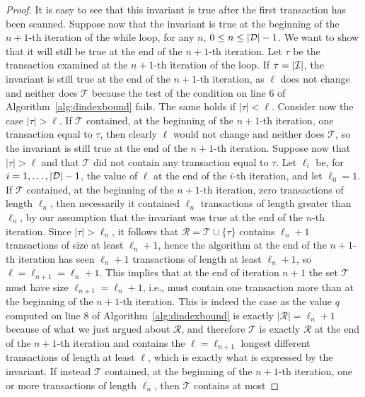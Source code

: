 \begin{proof}
  It is easy to see that this invariant is true after the first transaction has
  been scanned. Suppose now that the invariant is true at the beginning of the $n+1$-th
  iteration of the while loop, for any $n$, $0\le n\le |{\cal D}|-1$. 
  We want to show that it will still be true at the end of the $n+1$-th
  iteration. Let $\tau$ be the transaction examined at the $n+1$-th iteration of
  the loop. If $\tau=|{\cal I}|$, the invariant is still true at the end of the $n+1$-th
  iteration, as $\ell$ does not change and neither does $\mathcal{T}$ because
  the test of the condition on line 6 of Algorithm~\ref{alg:dindexbound} fails.
  The same holds if $|\tau|<\ell$. Consider now
  the case $|\tau|>\ell$. If $\mathcal{T}$ contained, at the beginning of the
  $n+1$-th iteration, one transaction equal to $\tau$, then clearly $\ell$ would not
  change and neither does $\mathcal{T}$, so the invariant is still true at the
  end of the $n+1$-th iteration. Suppose
  now that $|\tau|>\ell$ and that $\mathcal{T}$ did not contain any transaction
  equal to $\tau$. Let $\ell_i$ be, for $i=1,\dotsc,|{\cal D}|-1$, the value
  of $\ell$ at the end of the $i$-th iteration, and let $\ell_0=1$. If
  $\mathcal{T}$ contained, at the beginning of the $n+1$-th iteration, zero
  transactions of length $\ell_n$, then necessarily it contained $\ell_n$
  transactions of length greater than
  $\ell_n$, by our assumption that the invariant was true at the end of the
  $n$-th iteration. Since $|\tau|>\ell_n$, it follows that
  $\mathcal{R}=\mathcal{T}\cup\{\tau\}$ contains $\ell_n+1$ transactions of size
  at least $\ell_n+1$, hence the algorithm at the end of the $n+1$-th iteration has
  seen $\ell_n+1$ transactions of length at least $\ell_n+1$, so
  $\ell=\ell_{n+1}=\ell_n+1$. This implies that at the end of iteration $n+1$
  the set $\mathcal{T}$ must have size $\ell_{n+1}=\ell_n+1$, i.e., must contain
  one transaction more than at the beginning of the $n+1$-th iteration. This is
  indeed the case as the value $q$ computed on line 8 of
  Algorithm~\ref{alg:dindexbound} is exactly $|\mathcal{R}|=\ell_n+1$
  because of what we just argued about $\mathcal{R}$, and therefore
  $\mathcal{T}$ is exactly $\mathcal{R}$ at the end of the $n+1$-th iteration and
  contains the $\ell=\ell_{n+1}$ longest different transactions of length at
  least $\ell$, which is exactly what is expressed by the invariant. If instead
  $\mathcal{T}$ contained, at the beginning of the $n+1$-th iteration, one or more
  transactions of length $\ell_n$, then $\mathcal{T}$ contains at most

\end{proof}
